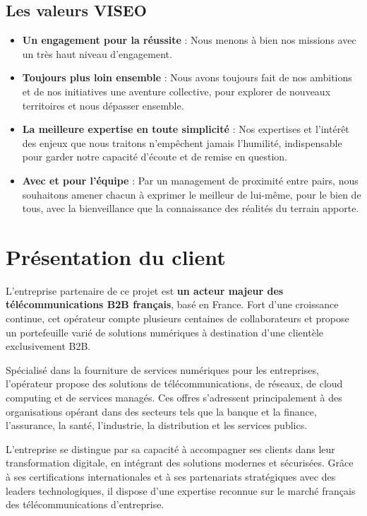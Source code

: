 \subsection{Les valeurs VISEO}

\begin{itemize}
    \item \textbf{Un engagement pour la r\'eussite} : Nous menons \`a bien nos missions avec un tr\`es haut niveau d'engagement.
    \item \textbf{Toujours plus loin ensemble} : Nous avons toujours fait de nos ambitions et de nos initiatives une aventure collective, pour explorer de nouveaux territoires et nous d\'epasser ensemble.
    \item \textbf{La meilleure expertise en toute simplicit\'e} : Nos expertises et l'int\'er\^et des enjeux que nous traitons n'emp\^echent jamais l'humilit\'e, indispensable pour garder notre capacit\'e d'\'ecoute et de remise en question.
    \item \textbf{Avec et pour l'\'equipe} : Par un management de proximit\'e entre pairs, nous souhaitons amener chacun \`a exprimer le meilleur de lui-m\^eme, pour le bien de tous, avec la bienveillance que la connaissance des r\'ealit\'es du terrain apporte.
\end{itemize}

\section{Pr\'esentation du client}

L'entreprise partenaire de ce projet est \textbf{un acteur majeur des télécommunications B2B français}, basé en France. Fort d'une croissance continue, cet opérateur compte plusieurs centaines de collaborateurs et propose un portefeuille varié de solutions numériques à destination d'une clientèle exclusivement B2B.

Spécialisé dans la fourniture de services numériques pour les entreprises, l'opérateur propose des solutions de télécommunications, de réseaux, de cloud computing et de services managés. Ces offres s'adressent principalement \`a des organisations op\'erant dans des secteurs tels que la banque et la finance, l'assurance, la sant\'e, l'industrie, la distribution et les services publics.

L'entreprise se distingue par sa capacit\'e \`a accompagner ses clients dans leur transformation digitale, en int\'egrant des solutions modernes et s\'ecuris\'ees. Grâce à ses certifications internationales et à ses partenariats stratégiques avec des leaders technologiques, il dispose d'une expertise reconnue sur le marché français des télécommunications d'entreprise.

